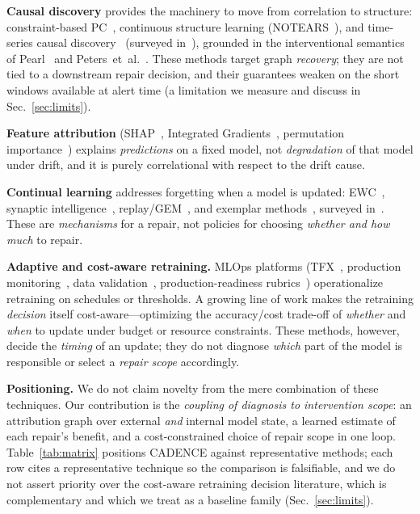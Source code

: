 \documentclass[conference]{IEEEtran}
\begin{document}
\textbf{Causal discovery} provides the machinery to move from correlation
to structure: constraint-based PC~\cite{spirtes2000causation}, continuous
structure learning (NOTEARS~\cite{zheng2018notears}), and time-series
causal discovery~\cite{runge2019pcmci} (surveyed in~\cite{glymour2019review}),
grounded in the interventional
semantics of Pearl~\cite{pearl2009causality} and
Peters~et~al.~\cite{peters2017elements}. These methods target graph
\emph{recovery}; they are not tied to a downstream repair decision, and
their guarantees weaken on the short windows available at alert time
(a limitation we measure and discuss in Sec.~\ref{sec:limits}).

\textbf{Feature attribution} (SHAP~\cite{lundberg2017shap}, Integrated
Gradients~\cite{sundararajan2017ig}, permutation
importance~\cite{breiman2001random}) explains \emph{predictions} on a
fixed model, not \emph{degradation} of that model under drift, and it is
purely correlational with respect to the drift cause.

\textbf{Continual learning} addresses forgetting when a model is updated:
EWC~\cite{kirkpatrick2017ewc}, synaptic
intelligence~\cite{zenke2017si}, replay/GEM~\cite{lopezpaz2017gem}, and
exemplar methods~\cite{rebuffi2017icarl}, surveyed
in~\cite{delange2021continual}. These are \emph{mechanisms} for a repair,
not policies for choosing \emph{whether and how much} to repair.

\textbf{Adaptive and cost-aware retraining.} MLOps platforms
(TFX~\cite{baylor2017tfx}, production monitoring~\cite{klaise2020monitoring},
data validation~\cite{polyzotis2019data}, production-readiness
rubrics~\cite{breck2017mltest}) operationalize retraining on schedules or
thresholds. A growing line of work makes the retraining \emph{decision}
itself cost-aware---optimizing the accuracy/cost trade-off of \emph{whether}
and \emph{when} to update under budget or resource constraints. These
methods, however, decide the \emph{timing} of an update; they do not
diagnose \emph{which} part of the model is responsible or select a
\emph{repair scope} accordingly.

\textbf{Positioning.} We do not claim novelty from the mere combination of
these techniques. Our contribution is the \emph{coupling of diagnosis to
intervention scope}: an attribution graph over external \emph{and} internal
model state, a learned estimate of each repair's benefit, and a
cost-constrained choice of repair scope in one loop. Table~\ref{tab:matrix}
positions CADENCE against representative methods; each row cites a
representative technique so the comparison is falsifiable, and we do not
assert priority over the cost-aware retraining decision literature, which is
complementary and which we treat as a baseline family
(Sec.~\ref{sec:limits}).
\end{document}

